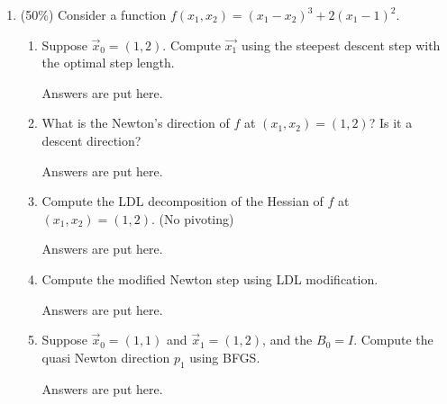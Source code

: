\documentclass[a4paper,10pt]{article}
\begin{document}
\begin{enumerate}
{}

  \item (50\%) Consider a function $f(x_1,x_2) = (x_1-x_2)^3+2(x_1-1)^2$. 
    \begin{enumerate}
    \item Suppose $\vec{x}_0=(1,2)$. Compute $\vec{x_1}$ using the steepest descent step with the optimal step length.

{\color{blue} Answers are put here. 

    \begin{CJK*}{UTF8}{bsmi}

\end{CJK*}

}

    \item What is the Newton's direction of $f$ at $(x_1,x_2)=(1,2)$?  Is it a descent direction?

{\color{blue} Answers are put here. 

    \begin{CJK*}{UTF8}{bsmi}

\end{CJK*}

}

    \item Compute the LDL decomposition of the Hessian of $f$ at $(x_1,x_2)=(1,2)$. (No pivoting)


{\color{blue} Answers are put here. 

    \begin{CJK*}{UTF8}{bsmi}

\end{CJK*}

}
    \item Compute the modified Newton step using LDL modification.

{\color{blue} Answers are put here. 

    \begin{CJK*}{UTF8}{bsmi}

\end{CJK*}

}
    \item Suppose $\vec{x}_0=(1,1)$ and $\vec{x}_{1}=(1,2)$, and the $B_0=I$. Compute the quasi Newton direction $p_1$ using BFGS.

{\color{blue} Answers are put here. 

    \begin{CJK*}{UTF8}{bsmi}

\end{CJK*}

}

    \end{enumerate}


\end{enumerate}
\end{document}
